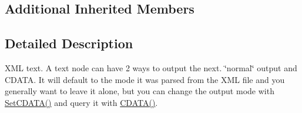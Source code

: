 \subsection*{Additional Inherited Members}


\subsection{Detailed Description}
X\-M\-L text. A text node can have 2 ways to output the next. \char`\"{}normal\char`\"{} output and C\-D\-A\-T\-A. It will default to the mode it was parsed from the X\-M\-L file and you generally want to leave it alone, but you can change the output mode with \hyperlink{class_ti_xml_text_acb17ff7c5d09b2c839393445a3de5ea9}{Set\-C\-D\-A\-T\-A()} and query it with \hyperlink{class_ti_xml_text_ad1a6a6b83fa2271022dd97c072a2b586}{C\-D\-A\-T\-A()}. 

